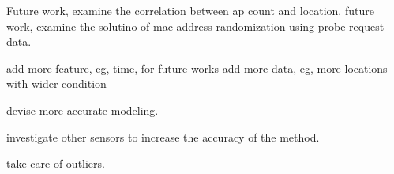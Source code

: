 Future work, examine the correlation between ap count and location.
future work, examine the solutino of mac address randomization using probe request data.

add more feature, eg, time, for future works
add more data, eg, more locations with wider condition

devise more accurate modeling.

investigate other sensors to increase the accuracy of the method.

take care of outliers.

